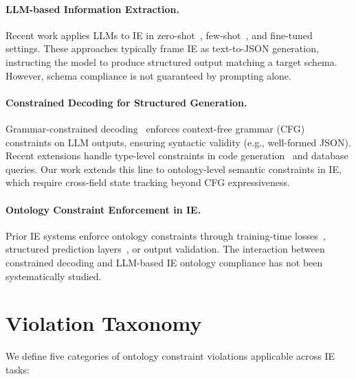 \documentclass[11pt]{article}
\begin{document}
\paragraph{LLM-based Information Extraction.}
Recent work applies LLMs to IE in zero-shot~\citep{wadhwa2023revisiting,wei2023zero}, few-shot~\citep{wan2023gpt}, and fine-tuned~\citep{xu2023unleash} settings.
These approaches typically frame IE as text-to-JSON generation, instructing the model to produce structured output matching a target schema.
However, schema compliance is not guaranteed by prompting alone.

\paragraph{Constrained Decoding for Structured Generation.}
Grammar-constrained decoding~\citep{willard2023efficient,zheng2024xgrammar} enforces context-free grammar (CFG) constraints on LLM outputs, ensuring syntactic validity (e.g., well-formed JSON).
Recent extensions handle type-level constraints in code generation~\citep{ugare2024pldi} and database queries.
Our work extends this line to ontology-level semantic constraints in IE, which require cross-field state tracking beyond CFG expressiveness.

\paragraph{Ontology Constraint Enforcement in IE.}
Prior IE systems enforce ontology constraints through training-time losses~\citep{lin2020joint}, structured prediction layers~\citep{zhong2021frustratingly}, or output validation.
The interaction between constrained decoding and LLM-based IE ontology compliance has not been systematically studied.

\section{Violation Taxonomy}
\label{sec:taxonomy}

We define five categories of ontology constraint violations applicable across IE tasks:
\end{document}
